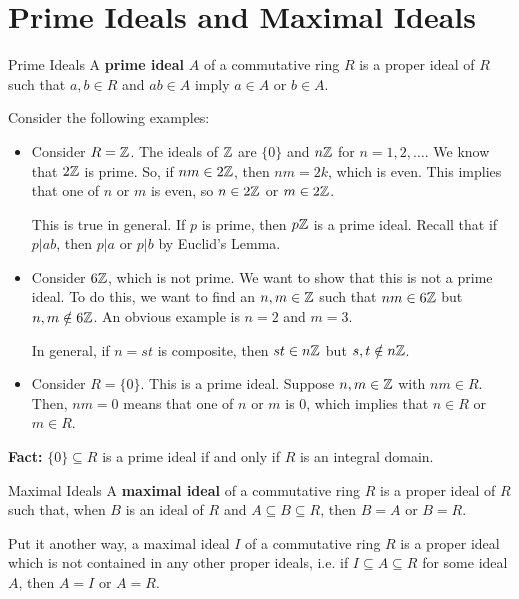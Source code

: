 \documentclass[letterpaper]{article}
\begin{document}
\section{Prime Ideals and Maximal Ideals}

\begin{definition}{Prime Ideals}{}
    A \textbf{prime ideal} $A$ of a commutative ring $R$ is a proper ideal of $R$ such that $a, b \in R$ and $ab \in A$ imply $a \in A$ or $b \in A$. 
\end{definition}
Consider the following examples:
\begin{itemize}
    \item Consider $R = \mathbb{Z}$. The ideals of $\mathbb{Z}$ are $\{0\}$ and $n\mathbb{Z}$ for $n = 1, 2, \dots$. We know that $2\mathbb{Z}$ is prime. So, if $nm \in 2\mathbb{Z}$, then $nm = 2k$, which is even. This implies that one of $n$ or $m$ is even, so $n \in 2\mathbb{Z}$ or $m \in 2\mathbb{Z}$. 

    \bigskip 
    
    This is true in general. If $p$ is prime, then $p\mathbb{Z}$ is a prime ideal. Recall that if $p | ab$, then $p | a$ or $p | b$ by Euclid's Lemma. 

    \item Consider $6\mathbb{Z}$, which is not prime. We want to show that this is not a prime ideal. To do this, we want to find an $n, m \in \mathbb{Z}$ such that $nm \in 6\mathbb{Z}$ but $n, m \notin 6\mathbb{Z}$. An obvious example is $n = 2$ and $m = 3$. 
    
    \bigskip
    
    In general, if $n = st$ is composite, then $st \in n\mathbb{Z}$ but $s, t \notin n\mathbb{Z}$. 

    \item Consider $R = \{0\}$. This is a prime ideal. Suppose $n, m \in \mathbb{Z}$ with $nm \in R$. Then, $nm = 0$ means that one of $n$ or $m$ is 0, which implies that $n \in R$ or $m \in R$. 
\end{itemize}
\textbf{Fact:} $\{0\} \subseteq R$ is a prime ideal if and only if $R$ is an integral domain. 

\begin{definition}{Maximal Ideals}{}
    A \textbf{maximal ideal} of a commutative ring $R$ is a proper ideal of $R$ such that, when $B$ is an ideal of $R$ and $A \subseteq B \subseteq R$, then $B = A$ or $B = R$. 
    
    \bigskip

    Put it another way, a maximal ideal $I$ of a commutative ring $R$ is a proper ideal which is not contained in any other proper ideals, i.e. if $I \subseteq A \subseteq R$ for some ideal $A$, then $A = I$ or $A = R$. 
\end{definition}
\end{document}
